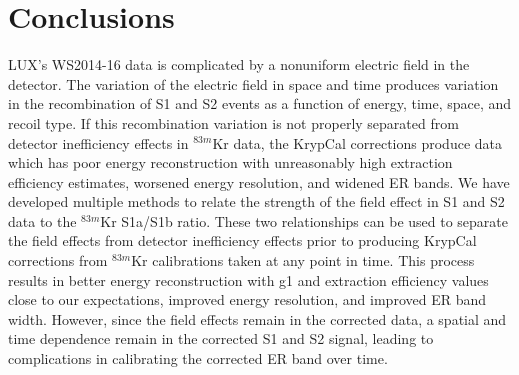 \documentclass[a4paper,10pt,twocolumn]{article}
\begin{document}
\section{Conclusions}

LUX's WS2014-16 data is complicated by a nonuniform electric field in the detector.  The variation of the electric field in space and time produces variation in the recombination of S1 and S2 events as a function of energy, time, space, and recoil type.  If this recombination variation is not properly separated from detector inefficiency effects in $^{83m}$Kr data, the KrypCal corrections produce data which has poor energy reconstruction with unreasonably high extraction efficiency estimates, worsened energy resolution, and widened ER bands.  We have developed multiple methods to relate the strength of the field effect in S1 and S2 data to the $^{83m}$Kr S1a/S1b ratio.  These two relationships can be used to separate the field effects from detector inefficiency effects prior to producing KrypCal corrections from $^{83m}$Kr calibrations taken at any point in time.  This process results in better energy reconstruction with g1 and extraction efficiency values close to our expectations,  improved energy resolution, and improved ER band width.  However, since the field effects remain in the corrected data, a spatial and time dependence remain in the corrected S1 and S2 signal, leading to complications in calibrating the corrected ER band over time.
\end{document}
